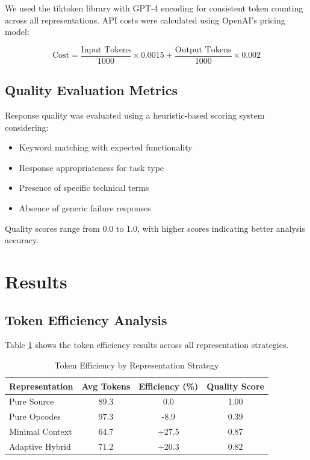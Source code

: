 \documentclass[conference]{IEEEtran}
\begin{document}
We used the tiktoken library with GPT-4 encoding for consistent token counting across all representations. API costs were calculated using OpenAI's pricing model:

\begin{equation}
\text{Cost} = \frac{\text{Input Tokens}}{1000} \times 0.0015 + \frac{\text{Output Tokens}}{1000} \times 0.002
\end{equation}

\subsection{Quality Evaluation Metrics}

Response quality was evaluated using a heuristic-based scoring system considering:

\begin{itemize}
\item Keyword matching with expected functionality
\item Response appropriateness for task type
\item Presence of specific technical terms
\item Absence of generic failure responses
\end{itemize}

Quality scores range from 0.0 to 1.0, with higher scores indicating better analysis accuracy.

\section{Results}

\subsection{Token Efficiency Analysis}

Table \ref{tab:efficiency} shows the token efficiency results across all representation strategies.

\begin{table}[htbp]
\caption{Token Efficiency by Representation Strategy}
\begin{center}
\begin{tabular}{|l|c|c|c|}
\hline
\textbf{Representation} & \textbf{Avg Tokens} & \textbf{Efficiency (\%)} & \textbf{Quality Score} \\
\hline
Pure Source & 89.3 & 0.0 & 1.00 \\
Pure Opcodes & 97.3 & -8.9 & 0.39 \\
Minimal Context & 64.7 & +27.5 & 0.87 \\
Adaptive Hybrid & 71.2 & +20.3 & 0.82 \\
\hline
\end{tabular}
\end{center}
\label{tab:efficiency}
\end{table}
\end{document}
